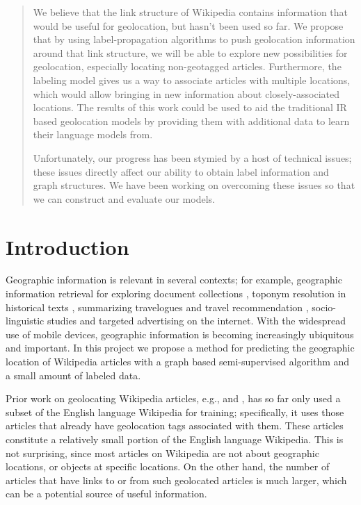 \begin{abstract}
    We believe that the link structure of Wikipedia contains information that
    would be useful for geolocation, but hasn't been used so far.
    We propose that by using label-propagation algorithms to push geolocation information
    around that link structure, we will be able to explore new possibilities
    for geolocation, especially locating non-geotagged articles. 
    Furthermore, the labeling model gives us a way to associate articles with
    multiple locations, which would allow bringing in new information about
    closely-associated locations. The results of this work could be used to aid the traditional IR based geolocation models by providing them with additional data to learn their language models from.
    \par
    Unfortunately, our progress has been stymied by a host of technical issues;
    these issues directly affect our ability to obtain label information and
    graph structures.
    We have been working on overcoming these issues so that we can construct
    and evaluate our models.
\end{abstract}

\section{Introduction}
Geographic information is relevant in several contexts; for example, geographic
information retrieval for exploring document collections
\cite{ding2000computing}, toponym resolution in historical texts
\cite{smith2001disambiguating}, summarizing travelogues and travel
recommendation \cite{hao-et-al:10}, socio-linguistic studies
\cite{eisenstein-smith-xing:11} and targeted advertising on the internet. 
With the widespread use of mobile devices, geographic information is becoming
increasingly ubiquitous and important. 
In this project we propose a method for predicting the geographic location of
Wikipedia articles with a graph based semi-supervised algorithm and a small
amount of labeled data.

Prior work on geolocating Wikipedia articles, e.g., \cite{wing-baldridge:11} and 
\cite{rolleretal:12}, has so far only used a subset of the English language
Wikipedia for training; specifically, it uses those articles that already have
geolocation tags associated with them. 
These articles constitute a relatively small portion of the English language
Wikipedia.  
This is not surprising, since most articles on Wikipedia are not about
geographic locations, or objects at specific locations.
On the other hand, the number of articles that have links to or from such
geolocated articles is much larger, which can be a potential source of useful
information. 

